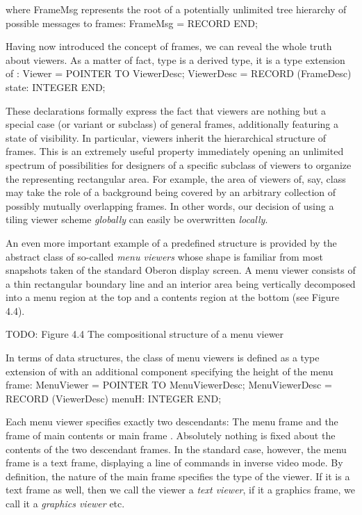 \noindent where FrameMsg represents the root of a potentially unlimited tree hierarchy of possible messages to frames:
\begintt
FrameMsg = RECORD END;
\endtt

\noindent Having now introduced the concept of frames, we can reveal the whole truth about viewers. As a matter of fact, type  is a derived type, it is a type extension of :
\begintt
Viewer = POINTER TO ViewerDesc;
ViewerDesc = RECORD (FrameDesc)
  state: INTEGER
END;
\endtt

\noindent These declarations formally express the fact that viewers
are nothing but a special case (or variant or subclass) of general
frames, additionally featuring a state of visibility. In particular,
viewers inherit the hierarchical structure of frames. This is an
extremely useful property immediately opening an unlimited spectrum of
possibilities for designers of a specific subclass of viewers to
organize the representing rectangular area. For example, the area of
viewers of, say, class  may take the role of a background being
covered by an arbitrary collection of possibly mutually overlapping
frames. In other words, our decision of using a tiling viewer scheme
\emph{globally} can easily be overwritten \emph{locally}.

An even more important example of a predefined structure is provided
by the abstract class of so-called \emph{menu viewers} whose shape is
familiar from most snapshots taken of the standard Oberon display
screen. A menu viewer consists of a thin rectangular boundary line and
an interior area being vertically decomposed into a menu region at the
top and a contents region at the bottom (see Figure 4.4).

TODO: Figure 4.4 The compositional structure of a menu viewer

In terms of data structures, the class of menu viewers is defined as a
type extension of  with an additional component 
specifying the height of the menu frame:
\begintt
MenuViewer = POINTER TO MenuViewerDesc;
MenuViewerDesc = RECORD (ViewerDesc)
  menuH: INTEGER
END;
\endtt

\noindent Each menu viewer  specifies exactly two
descendants: The menu frame  and the frame of main
contents or main frame . Absolutely nothing is fixed
about the contents of the two descendant frames. In the standard case,
however, the menu frame is a text frame, displaying a line of commands
in inverse video mode. By definition, the nature of the main frame
specifies the type of the viewer. If it is a text frame as well, then
we call the viewer a \emph{text viewer}, if it a graphics frame, we call it a
\emph{graphics viewer} etc.

